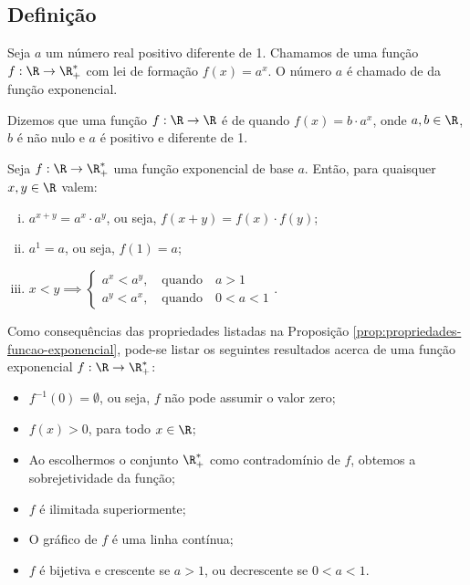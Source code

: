 \subsection{Definição}

\begin{definition}
    Seja $a$ um número real positivo diferente de 1. Chamamos de
 uma função $f: \R \to \R_+^*$ com lei de
formação $f(x) = a^x$. O número $a$ é chamado de  da função exponencial.
\end{definition}

\begin{definition}
Dizemos que uma função $f: \R \to \R$ é de 
quando $f(x) =b\cdot a^x$, onde $a,b \in\R$, $b$ é não nulo e $a$ é
positivo e diferente de 1.
\end{definition}

\begin{proposition}
\label{prop:propriedades-funcao-exponencial}
Seja $f: \R \to \R_+^*$ uma função exponencial de base $a$.
Então, para quaisquer $x, y \in \R$ valem:
%
\begin{enumerate}[(i)]
  \item  $a^{x+y} = a^x\cdot a^y$, ou seja, $f(x+y) = f(x)\cdot f(y)$;
  \item $a^1 = a$, ou seja, $f(1) = a$;
  \item $x<y \implies \begin{cases} a^x < a^y, \ \ \ \text{ quando } \ \ \ a>1 \\
                                    a^y < a^x, \ \ \ \text{ quando } \ \ \ 0<a<1
                       \end{cases}.$
\end{enumerate}
\end{proposition}

Como consequências das propriedades listadas na Proposição \ref{prop:propriedades-funcao-exponencial},
pode-se listar os seguintes resultados acerca de uma função exponencial $f: \R \to \R_+^*$:
%
\begin{itemize}
    \item $f^{-1}(0) = \emptyset$, ou seja, $f$ não pode assumir o valor
    zero;
    \item $f(x)>0$, para todo $x \in \R$;
    \item Ao escolhermos o conjunto $\R_+^*$ como contradomínio de $f$, obtemos
    a sobrejetividade da função;
    \item $f$ é ilimitada superiormente;
    \item O gráfico de $f$ é uma linha contínua;
    \item $f$ é bijetiva e crescente se $a>1$, ou decrescente se
    $0<a<1$.
\end{itemize}

